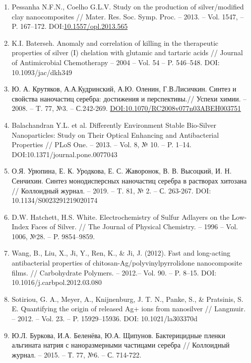 \begin{enumerate}
\def\labelenumi{\arabic{enumi}.}
\item
  Pessanha N.F.N., Coelho G.L.V. Study on the production of
  silver/modified clay nanocomposites // Mater. Res. Soc. Symp. Proc. --
  2013. -- Vol. 1547, -- P. 167--172.
  DOI:\href{http://dx.doi.org/10.1557/opl.2013.565}{10.1557/opl.2013.565}
\item
  K.I. Baterseh. Anomaly and correlation of killing in the therapeutic
  properties of silver (I) chelation with glutamic and tartaric acids //
  Journal of Antimicrobial Chemotherapy -- 2004 -- Vol. 54 -- P.
  546--548. DOI: 10.1093/jac/dkh349
\item
  Ю. А. Крутяков, А.А.Кудринский, А.Ю. Оленин, Г.В.Лисичкин. Синтез и
  свойства наночастиц серебра: достижения и перспективы.// Успехи химии.
  -- 2008. -- T. 77, №3. -- С.242-269.
  \href{https://doi.org/10.1070/RC2008v077n03ABEH003751}{DOI:10.1070/RC2008v077n03ABEH003751}
\item
  Balachandran Y.L. et al. Differently Environment Stable Bio-Silver
  Nanoparticles: Study on Their Optical Enhancing and Antibacterial
  Properties // PLoS One. -- 2013. -- Vol. 8, № 10. -- P. 1--14.
  DOI:10.1371/journal.pone.0077043
\item
  О.Я. Урюпина, Е. К. Уродкова, Е. С. Жаворонок, В. В. Высоцкий, И. Н.
  Сенчихин. Синтез монодисперсных наночастиц серебра в растворах
  хитозана // Коллоидный журнал. -- 2019. -- T. 81, № 2. -- С. 263-267.
  DOI: 10.1134/S0023291219020174
\item
  D.W. Hatchett, H.S. White. Electrochemistry of Sulfur Adlayers on the
  Low-Index Faces of Silver. // The Journal of Physical Chemistry. --
  1996 -- Vol. 1006, №28. -- P. 9854--9859.
\item
  Wang, B., Liu, X., Ji, Y., Ren, K., \& Ji, J. (2012). Fast and
  long-acting antibacterial properties of
  chitosan-Ag/polyvinylpyrrolidone nanocomposite films. // Carbohydrate
  Polymers. -- 2012.-- Vol. 90. -- P. 8--15. DOI:
  10.1016/j.carbpol.2012.03.080
\item
  Sotiriou, G. A., Meyer, A., Knijnenburg, J. T. N., Panke, S., \&
  Pratsinis, S. E. Quantifying the origin of released Ag+ ions from
  nanosilver // Langmuir. -- 2012. -- Vol. 23. -- P. 15929--15936. DOI:
  10.1021/la303370d
\item
  Ю.Л. Буркова, И.А. Беленёва, Ю.А. Щипунов. Бактерицидные пленки
  альгината натрия с наноразмерными частицами серебра // Коллоидный
  журнал. -- 2015. -- Т. 77, №6. -- С. 714-722.

\end{enumerate}
